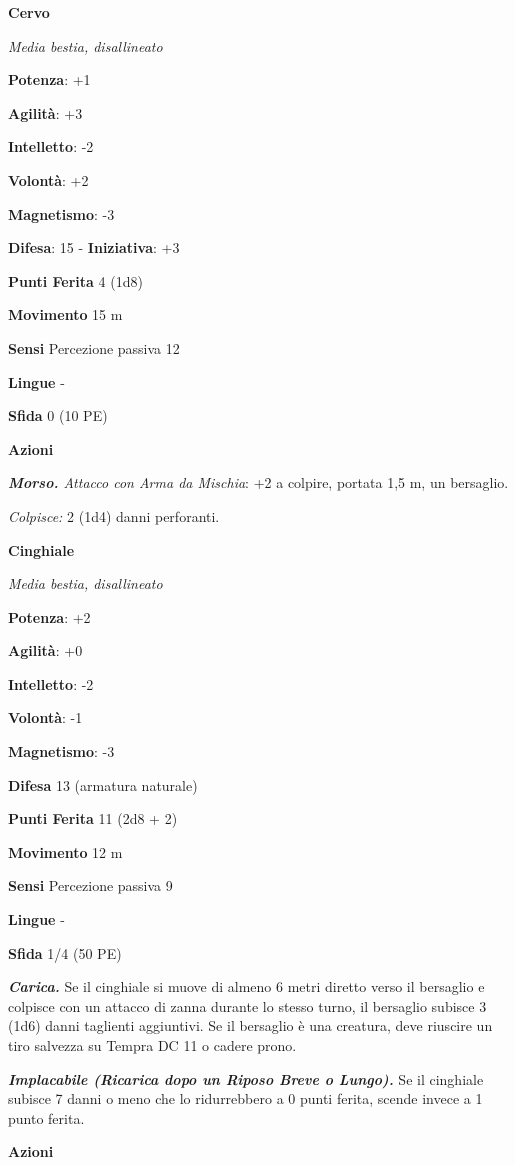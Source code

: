 \begin{multicols}{2}
\textbf{Cervo}

\emph{Media bestia, disallineato}

\textbf{Potenza}: +1

\textbf{Agilità}: +3

\textbf{Intelletto}: -2

\textbf{Volontà}: +2

\textbf{Magnetismo}: -3

\textbf{Difesa}: 15 - \textbf{Iniziativa}: +3

\textbf{Punti Ferita} 4 (1d8)

\textbf{Movimento} 15 m

\textbf{Sensi} Percezione passiva 12

\textbf{Lingue} -

\textbf{Sfida} 0 (10 PE)

\textbf{Azioni}

\emph{\textbf{Morso.} Attacco con Arma da Mischia}: +2 a colpire,
portata 1,5 m, un bersaglio.

\emph{Colpisce:} 2 (1d4) danni perforanti.

\textbf{Cinghiale}

\emph{Media bestia, disallineato}

\textbf{Potenza}: +2

\textbf{Agilità}: +0

\textbf{Intelletto}: -2

\textbf{Volontà}: -1

\textbf{Magnetismo}: -3

\textbf{Difesa} 13 (armatura naturale)

\textbf{Punti Ferita} 11 (2d8 + 2)

\textbf{Movimento} 12 m

\textbf{Sensi} Percezione passiva 9

\textbf{Lingue} -

\textbf{Sfida} 1/4 (50 PE)

\emph{\textbf{Carica.}} Se il cinghiale si muove di almeno 6 metri
diretto verso il bersaglio e colpisce con un attacco di zanna durante lo
stesso turno, il bersaglio subisce 3 (1d6) danni taglienti aggiuntivi.
Se il bersaglio è una creatura, deve riuscire un tiro salvezza su Tempra
DC 11 o cadere prono.

\emph{\textbf{Implacabile (Ricarica dopo un Riposo Breve o Lungo).}} Se
il cinghiale subisce 7 danni o meno che lo ridurrebbero a 0 punti
ferita, scende invece a 1 punto ferita.

\textbf{Azioni}


\end{multicols}
